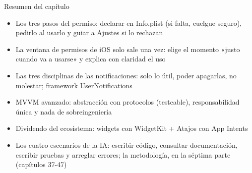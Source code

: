 \begin{tcbsummary}{Resumen del capítulo}
\begin{itemize}
  \item Los tres pasos del permiso: declarar en Info.plist (si falta, cuelgue seguro), pedirlo al usarlo y guiar a Ajustes si lo rechazan
  \item La ventana de permisos de iOS solo sale una vez: elige el momento «justo cuando va a usarse» y explica con claridad el uso
  \item Las tres disciplinas de las notificaciones: solo lo útil, poder apagarlas, no molestar; framework UserNotifications
  \item MVVM avanzado: abstracción con protocolos (testeable), responsabilidad única y nada de sobreingeniería
  \item Dividendo del ecosistema: widgets con WidgetKit + Atajos con App Intents
  \item Los cuatro escenarios de la IA: escribir código, consultar documentación, escribir pruebas y arreglar errores; la metodología, en la séptima parte (capítulos 37-47)
\end{itemize}

\end{tcbsummary}

